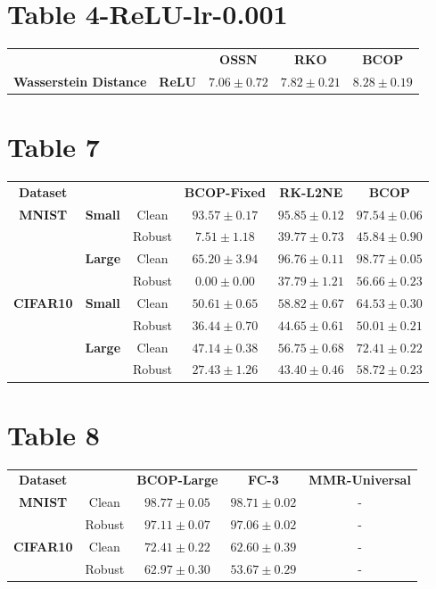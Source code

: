 \documentclass{article}%
\begin{document}
%
\section*{Table 4{-}ReLU{-}lr{-}0.001}%
\label{sec:Table4{-}ReLU{-}lr{-}0.001}%
\begin{tabularx}{\textwidth}{ccccc}%
\textbf{}&\textbf{}&\textbf{OSSN}&\textbf{RKO}&\textbf{BCOP}\\%
\cmidrule{1-5}%
\multirow{1}{*}{\textbf{Wasserstein Distance}}&\textbf{ReLU}&$7.06\pm0.72$&$7.82\pm0.21$&$\mathbf{8.28}\pm0.19$\\%
\end{tabularx}

%
\section*{Table 7}%
\label{sec:Table7}%
\begin{tabularx}{\textwidth}{c|cc|ccc}%
\textbf{Dataset}&\textbf{}&\textbf{}&\textbf{BCOP-Fixed}&\textbf{RK-L2NE}&\textbf{BCOP}\\%
\cmidrule{1-6}%
\multirow{4}{*}{\textbf{{MNIST}}}&\multirow{2}{*}{\textbf{Small}}&Clean&$93.57\pm0.17$&$95.85\pm0.12$&$\mathbf{97.54}\pm0.06$\\%
&&Robust&$7.51\pm1.18$&$39.77\pm0.73$&$\mathbf{45.84}\pm0.90$\\%
\cmidrule{2-6}%
&\multirow{2}{*}{\textbf{Large}}&Clean&$65.20\pm3.94$&$96.76\pm0.11$&$\mathbf{98.77}\pm0.05$\\%
&&Robust&$0.00\pm0.00$&$37.79\pm1.21$&$\mathbf{56.66}\pm0.23$\\%
\cmidrule{1-6}%
\multirow{4}{*}{\textbf{{CIFAR10}}}&\multirow{2}{*}{\textbf{Small}}&Clean&$50.61\pm0.65$&$58.82\pm0.67$&$\mathbf{64.53}\pm0.30$\\%
&&Robust&$36.44\pm0.70$&$44.65\pm0.61$&$\mathbf{50.01}\pm0.21$\\%
\cmidrule{2-6}%
&\multirow{2}{*}{\textbf{Large}}&Clean&$47.14\pm0.38$&$56.75\pm0.68$&$\mathbf{72.41}\pm0.22$\\%
&&Robust&$27.43\pm1.26$&$43.40\pm0.46$&$\mathbf{58.72}\pm0.23$\\%
\cmidrule{1-6}%
\end{tabularx}

%
\section*{Table 8}%
\label{sec:Table8}%
\begin{tabularx}{\textwidth}{c|c|ccc}%
\textbf{Dataset}&&\textbf{BCOP-Large}&\textbf{FC-3}&\textbf{MMR-Universal}\\%
\cmidrule{1-5}%
\multirow{2}{*}{\textbf{{MNIST}}}&Clean&$\mathbf{98.77}\pm0.05$&$98.71\pm0.02$&{-}\\%
&Robust&$\mathbf{97.11}\pm0.07$&$97.06\pm0.02$&{-}\\%
\cmidrule{1-5}%
\multirow{2}{*}{\textbf{{CIFAR10}}}&Clean&$\mathbf{72.41}\pm0.22$&$62.60\pm0.39$&{-}\\%
&Robust&$\mathbf{62.97}\pm0.30$&$53.67\pm0.29$&{-}\\%
\cmidrule{1-5}%
\end{tabularx}
\end{document}
